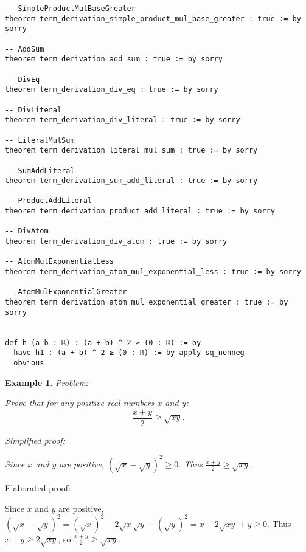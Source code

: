 \documentclass{article}
\newtheorem{example}{Example}
\begin{document}
\begin{tcolorbox}[colback=white!10, width=\linewidth]
\begin{lstlisting}[language=Lean4]
-- SimpleProductMulBaseGreater
theorem term_derivation_simple_product_mul_base_greater : true := by sorry

-- AddSum
theorem term_derivation_add_sum : true := by sorry

-- DivEq
theorem term_derivation_div_eq : true := by sorry

-- DivLiteral
theorem term_derivation_div_literal : true := by sorry

-- LiteralMulSum
theorem term_derivation_literal_mul_sum : true := by sorry

-- SumAddLiteral
theorem term_derivation_sum_add_literal : true := by sorry

-- ProductAddLiteral
theorem term_derivation_product_add_literal : true := by sorry

-- DivAtom
theorem term_derivation_div_atom : true := by sorry

-- AtomMulExponentialLess
theorem term_derivation_atom_mul_exponential_less : true := by sorry

-- AtomMulExponentialGreater
theorem term_derivation_atom_mul_exponential_greater : true := by sorry


def h (a b : ℝ) : (a + b) ^ 2 ≥ (0 : ℝ) := by
  have h1 : (a + b) ^ 2 ≥ (0 : ℝ) := by apply sq_nonneg
  obvious

\end{lstlisting}
\end{tcolorbox}


\begin{example}
Problem:
\begin{tcolorbox}[colback=yellow!10, width=\linewidth]
Prove that for any positive real numbers $x$ and $y$:
    $$\frac{x+y}{2} \geq \sqrt{xy}.$$
\end{tcolorbox}

Simplified proof:
\begin{tcolorbox}[colback=blue!10, width=\linewidth]
Since $x$ and $y$ are positive, $(\sqrt x - \sqrt y)^2 \ge 0$. Thus $\frac{x+y}{2} \ge \sqrt{xy}$.
\end{tcolorbox}
\end{example}

Elaborated proof:
\begin{tcolorbox}[colback=green!10, width=\linewidth]
Since $x$ and $y$ are positive, $(\sqrt x - \sqrt y)^2 = (\sqrt x)^2 - 2\sqrt x \sqrt y + (\sqrt y)^2 = x - 2\sqrt{xy} + y \ge 0$. Thus $x + y \ge 2\sqrt{xy}$, so $\frac{x+y}{2} \ge \sqrt{xy}$.
\end{tcolorbox}
\end{document}
